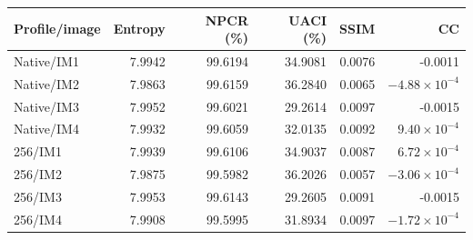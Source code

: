 \begin{center}
{\footnotesize
\setlength{\tabcolsep}{4pt}
\begin{tabular}{@{}lrrrrr@{}}
\toprule
Profile/image & Entropy & NPCR (\%) & UACI (\%) & SSIM & CC \\
\midrule
Native/IM1 & 7.9942 & 99.6194 & 34.9081 & 0.0076 & -0.0011 \\
Native/IM2 & 7.9863 & 99.6159 & 36.2840 & 0.0065 & $-4.88\times10^{-4}$ \\
Native/IM3 & 7.9952 & 99.6021 & 29.2614 & 0.0097 & -0.0015 \\
Native/IM4 & 7.9932 & 99.6059 & 32.0135 & 0.0092 & $9.40\times10^{-4}$ \\
256/IM1 & 7.9939 & 99.6106 & 34.9037 & 0.0087 & $6.72\times10^{-4}$ \\
256/IM2 & 7.9875 & 99.5982 & 36.2026 & 0.0057 & $-3.06\times10^{-4}$ \\
256/IM3 & 7.9953 & 99.6143 & 29.2605 & 0.0091 & -0.0015 \\
256/IM4 & 7.9908 & 99.5995 & 31.8934 & 0.0097 & $-1.72\times10^{-4}$ \\
\bottomrule
\end{tabular}}
\end{center}
